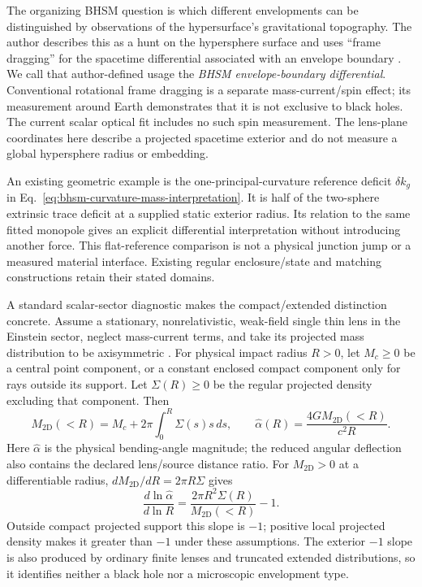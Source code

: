 The organizing BHSM question is which different envelopments can be
distinguished by observations of the hypersurface's gravitational
topography. The author describes this as a hunt on the hypersphere
surface and uses ``frame dragging'' for the spacetime differential
associated with an envelope boundary \cite{CarberryEnvelopmentSearch2026}.
We call that author-defined usage the \emph{BHSM envelope-boundary
differential}. Conventional rotational frame dragging is a separate
mass-current/spin effect; its measurement around Earth
\cite{Everitt2011GravityProbeB} demonstrates that it is not exclusive
to black holes. The current scalar optical fit includes no such spin
measurement. The lens-plane coordinates here describe a projected
spacetime exterior and do not measure a global hypersphere radius or
embedding.

An existing geometric example is the one-principal-curvature reference
deficit $\delta k_g$ in Eq.~\eqref{eq:bhsm-curvature-mass-interpretation}.
It is half of the two-sphere extrinsic trace deficit at a supplied
static exterior radius. Its relation to the same fitted monopole gives
an explicit differential interpretation without introducing another
force. This flat-reference comparison is not a physical junction jump
or a measured material interface. Existing regular enclosure/state
and matching constructions retain their stated domains.

A standard scalar-sector diagnostic makes the compact/extended
distinction concrete. Assume a stationary, nonrelativistic, weak-field
single thin lens in the Einstein sector, neglect mass-current terms,
and take its projected mass distribution to be axisymmetric
\cite{BartelmannSchneider2001}. For physical impact radius $R>0$,
let $M_c\geq0$ be a central point component, or a constant enclosed
compact component only for rays outside its support. Let
$\Sigma(R)\geq0$ be the regular projected density excluding that
component. Then
\begin{equation}
 M_{2\mathrm D}(<R)=M_c+2\pi\int_0^R\Sigma(s)s\,ds,
 \qquad
 \widehat\alpha(R)=\frac{4G M_{2\mathrm D}(<R)}{c^2R}.
 \label{eq:envelopment-profile-bending}
\end{equation}
Here $\widehat\alpha$ is the physical bending-angle magnitude; the
reduced angular deflection also contains the declared lens/source
distance ratio. For $M_{2\mathrm D}>0$ at a differentiable radius,
$dM_{2\mathrm D}/dR=2\pi R\Sigma$ gives
\begin{equation}
 \frac{d\ln\widehat\alpha}{d\ln R}
 =\frac{2\pi R^2\Sigma(R)}{M_{2\mathrm D}(<R)}-1.
 \label{eq:envelopment-profile-slope}
\end{equation}
Outside compact projected support this slope is $-1$; positive local
projected density makes it greater than $-1$ under these assumptions.
The exterior $-1$ slope is also produced by ordinary finite lenses and
truncated extended distributions, so it identifies neither a black
hole nor a microscopic envelopment type.

